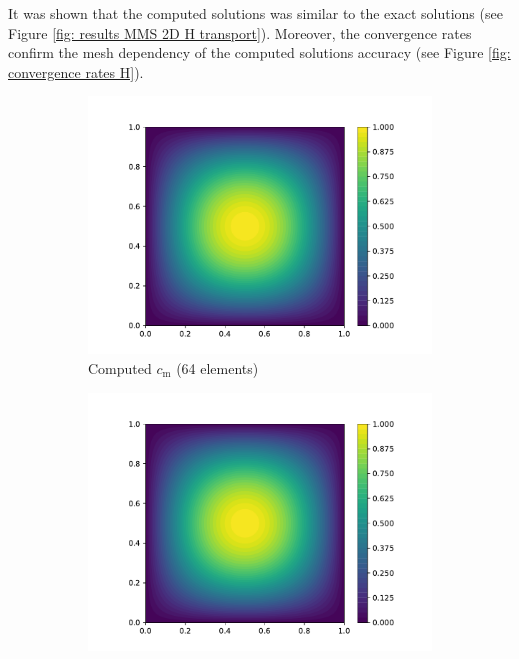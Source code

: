 It was shown that the computed solutions was similar to the exact solutions (see Figure \ref{fig: results MMS 2D H transport}).
Moreover, the convergence rates confirm the mesh dependency of the computed solutions accuracy (see Figure \ref{fig: convergence rates H}).

\begin{figure}
    \centering
    \begin{subfigure}{0.3\linewidth}
        \centering
        \includegraphics[width=\linewidth]{Figures/Chapter2/c_m.pdf}
        \caption{Computed $c_\mathrm{m}$ (64 elements)}
    \end{subfigure}%
    \begin{subfigure}{0.3\linewidth}
        \centering
        \includegraphics[width=\linewidth]{Figures/Chapter2/c_t.pdf}

\end{subfigure}
\end{figure}
